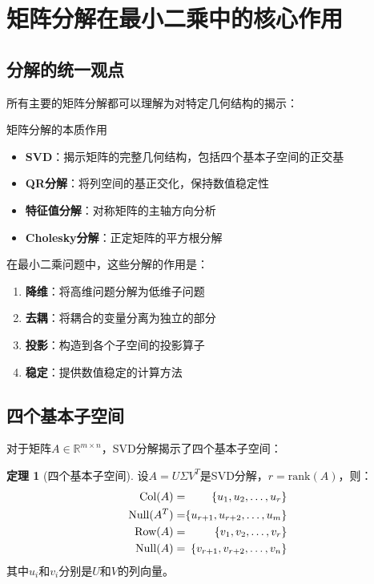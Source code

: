 \documentclass[11pt,a4paper]{ctexart}
\theoremstyle{definition}
\newtheorem{theorem}{定理}[section]
\newcommand{\RR}{\mathbb{R}}
\newcommand{\rank}{\text{rank}}
\newcommand{\Null}{\text{Null}}
\newcommand{\Col}{\text{Col}}
\newcommand{\Row}{\text{Row}}
\begin{document}
\section{矩阵分解在最小二乘中的核心作用}

\subsection{分解的统一观点}

所有主要的矩阵分解都可以理解为对特定几何结构的揭示：

\begin{insight}{矩阵分解的本质作用}
\begin{itemize}
\item \textbf{SVD}：揭示矩阵的完整几何结构，包括四个基本子空间的正交基
\item \textbf{QR分解}：将列空间的基正交化，保持数值稳定性
\item \textbf{特征值分解}：对称矩阵的主轴方向分析
\item \textbf{Cholesky分解}：正定矩阵的平方根分解
\end{itemize}

在最小二乘问题中，这些分解的作用是：
\begin{enumerate}
\item \textbf{降维}：将高维问题分解为低维子问题
\item \textbf{去耦}：将耦合的变量分离为独立的部分
\item \textbf{投影}：构造到各个子空间的投影算子
\item \textbf{稳定}：提供数值稳定的计算方法
\end{enumerate}
\end{insight}

\subsection{四个基本子空间}

对于矩阵$A \in \RR^{m \times n}$，SVD分解揭示了四个基本子空间：

\begin{theorem}[四个基本子空间]
设$A = U\Sigma V^T$是SVD分解，$r = \rank(A)$，则：
\begin{align}
\Col(A) &= \span\{u_1, u_2, \ldots, u_r\} \\
\Null(A^T) &= \span\{u_{r+1}, u_{r+2}, \ldots, u_m\} \\
\Row(A) &= \span\{v_1, v_2, \ldots, v_r\} \\
\Null(A) &= \span\{v_{r+1}, v_{r+2}, \ldots, v_n\}
\end{align}
其中$u_i$和$v_i$分别是$U$和$V$的列向量。
\end{theorem}
\end{document}
